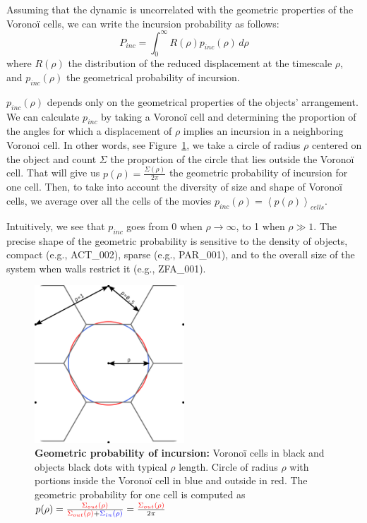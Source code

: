     Assuming that the dynamic is uncorrelated with the geometric properties of the Voronoï cells, we can write the incursion probability as follows:
    \begin{equation}
        P_{inc}=\int_{0}^{\infty} R(\rho)p_{inc}(\rho) \,d \rho
    \end{equation}
    where $R(\rho)$ the distribution of the reduced displacement at the timescale $\rho$, and $p_{inc}(\rho)$ the geometrical probability of incursion.

    $p_{inc}(\rho)$ depends only on the geometrical properties of the objects' arrangement. We can calculate $p_{inc}$ by taking a Voronoï cell and determining the proportion of the angles for which a displacement of $\rho$ implies an incursion in a neighboring Voronoi cell. In other words, see Figure~\ref{part_1:fig_pinc}, we take a circle of radius $\rho$ centered on the object and count $\Sigma$ the proportion of the circle that lies outside the Voronoï cell. That will give us $p(\rho)=\frac{\Sigma(\rho)}{2\pi}$ the geometric probability of incursion for one cell. Then, to take into account the diversity of size and shape of Voronoï cells, we average over all the cells of the movies $p_{inc}(\rho)=\left<p(\rho)\right>_{cells}$.

    Intuitively, we see that $p_{inc}$ goes from 0 when $\rho \to \infty$, to 1 when $\rho \gg 1$. The precise shape of the geometric probability is sensitive to the density of objects, compact (e.g., ACT\_002), sparse (e.g., PAR\_001), and to the overall size of the system when walls restrict it (e.g., ZFA\_001).

	\begin{figure}[h!]
    \centering
    \includegraphics[width=0.5\textwidth]{part_1/assets/Figure_pinc.png}
    \caption{\textbf{Geometric probability of incursion:} Voronoï cells in black and objects black dots with typical $\rho$ length. Circle of radius $\rho$ with portions inside the Voronoï cell in blue and outside in red. The geometric probability for one cell is computed as $p(\rho)=\frac{\color{red}{\Sigma_{out}(\rho)}}{\color{red}{\Sigma_{out}(\rho)} \color{black}{+}\color{blue}{\Sigma_{in}(\rho)}} = \frac{\color{red}{\Sigma_{out}(\rho)}}{2\pi}$}
    \label{part_1:fig_pinc}
    \end{figure}

